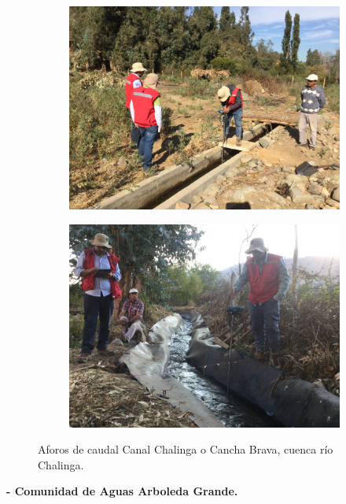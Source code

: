 \documentclass[]{article}
\begin{document}
\begin{figure}[H]
  \centering
\begin{subfigure}{.45\textwidth}
\hfill
  \includegraphics[angle= 180, width=\textwidth]{Foto/ch3.jpg}
\end{subfigure}
\hfill
\begin{subfigure}{.45\textwidth}
\hfill
  \includegraphics[angle= 180, width=\textwidth]{Foto/ch4.jpg} 
\end{subfigure}
\caption{Aforos de caudal Canal Chalinga o Cancha Brava, cuenca río Chalinga.}
\end{figure}
\clearpage

\textbf{- Comunidad de Aguas Arboleda Grande.}
\end{document}
